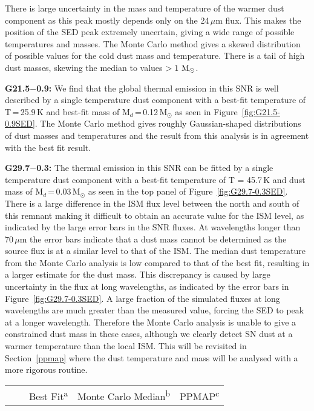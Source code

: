 \documentclass[fleqn,usenatbib]{mnras}
\newcommand\ColdMassbBest{0.12}
\newcommand\ColdMasscBest{0.03}
\newcommand\ColdTempbBest{25.9}
\newcommand\ColdTempcBest{45.7}
\begin{document}
{There is large uncertainty in the mass and temperature of the warmer dust component as this peak mostly depends only on the 24\,$\mu$m flux. This makes the position of the SED peak extremely uncertain, giving a wide range of possible temperatures and masses. The Monte Carlo method gives a skewed distribution of possible values for the cold dust mass and temperature. There is a tail of high dust masses, skewing the median to values $>1\,\rm\,M_{\odot}$.
\bigskip


\textbf{G21.5$-$0.9:} We find that the global thermal emission in this SNR is well described by a single temperature dust component with a best-fit temperature of T\,=\,\ColdTempbBest\,K and best-fit mass of M$_d$\,=\,\ColdMassbBest\,M$_\odot$ as seen in Figure~\ref{fig:G21.5-0.9SED}.
The Monte Carlo method gives roughly Gaussian-shaped distributions of dust masses and temperatures and the result from this analysis is in agreement with the best fit result.
\bigskip

\textbf{G29.7$-$0.3:} The thermal emission in this SNR can be fitted by a single temperature dust component with a best-fit temperature of T = \ColdTempcBest\,K and dust mass of M$_d$\,=\,\ColdMasscBest\,M$_\odot$ as seen in the top panel of Figure~\ref{fig:G29.7-0.3SED}. There is a large difference in the ISM flux level between the north and south of this remnant making it difficult to obtain an accurate value for the ISM level, as indicated by the large error bars in the SNR fluxes. At wavelengths longer than 70\,$\mu$m the error bars indicate that a dust mass cannot be determined as the source flux is at a similar level to that of the ISM.
The median dust temperature from the Monte Carlo analysis is low compared to that of the best fit, resulting in a larger estimate for the dust mass. This discrepancy is caused by large uncertainty in the flux at long wavelengths, as indicated by the error bars in Figure~\ref{fig:G29.7-0.3SED}. A large fraction of the simulated fluxes at long wavelengths are much greater than the measured value, forcing the SED to peak at a longer wavelength. Therefore the Monte Carlo analysis is unable to give a constrained dust mass in these cases, although we clearly detect SN dust at a warmer temperature than the local ISM. This will be revisited in Section~\ref{ppmap} where the dust temperature and mass will be analysed with a more rigorous routine.

\bigskip

\begin{table*}
	\centering
	\begin{tabular}{c c c c c c c c c c c}
	\hline
	& & \multicolumn{4}{|c}{Best Fit\textsuperscript{a}}
	& \multicolumn{4}{|c}{Monte Carlo Median\textsuperscript{b}}
	& PPMAP\textsuperscript{c} \\



\end{tabular}
\end{table*}}
\end{document}
